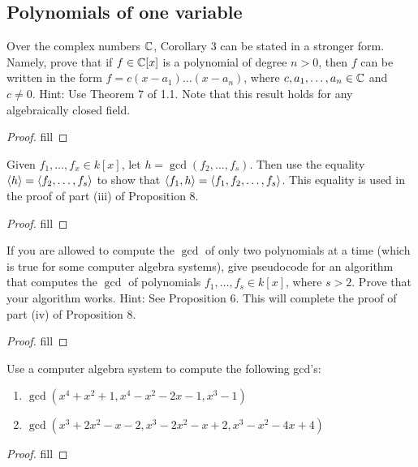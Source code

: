 \subsection{Polynomials of one variable}


\begin{exercise}{1}
Over the complex numbers $\mathbb{C}$, Corollary 3 can be stated in a stronger form. Namely, prove that if $f\in\mathbb{C}[x]$ is a polynomial of degree $n>0$, then $f$ can be written in the form $f=c(x-a_1)\dots(x-a_n)$, where $c,a_1,\dots,a_n\in\mathbb{C}$ and $c\neq 0$. Hint: Use Theorem 7 of 1.1. Note that this result holds for any algebraically closed field.
\end{exercise}
\begin{proof}
fill
\end{proof}

\begin{exercise}{6}
Given $f_1,\dots,f_x\in k[x]$, let $h=\gcd(f_2,\dots,f_s)$. Then use the equality $\langle h\rangle=\langle f_2,\dots,f_s\rangle$ to show that $\langle f_1,h\rangle=\langle f_1,f_2,\dots,f_s\rangle$. This equality is used in the proof of part (iii) of Proposition 8.
\end{exercise}
\begin{proof}
fill
\end{proof}

\begin{exercise}{7}
If you are allowed to compute the $\gcd$ of only two polynomials at a time (which is true for some computer algebra systems), give pseudocode for an algorithm that computes the $\gcd$ of polynomials $f_1,\dots,f_s\in k[x]$, where $s>2$. Prove that your algorithm works. Hint: See Proposition 6. This will complete the proof of part (iv) of Proposition 8.
\end{exercise}
\begin{proof}
fill
\end{proof}

\begin{exercise}{8}
Use a computer algebra system to compute the following gcd's:
\begin{enumerate}
    \item $\gcd(x^4+x^2+1, x^4-x^2-2x-1,x^3-1)$
    \item $\gcd(x^3+2x^2-x-2,x^3-2x^2-x+2,x^3-x^2-4x+4)$
\end{enumerate}
\end{exercise}
\begin{proof}
fill
\end{proof}

